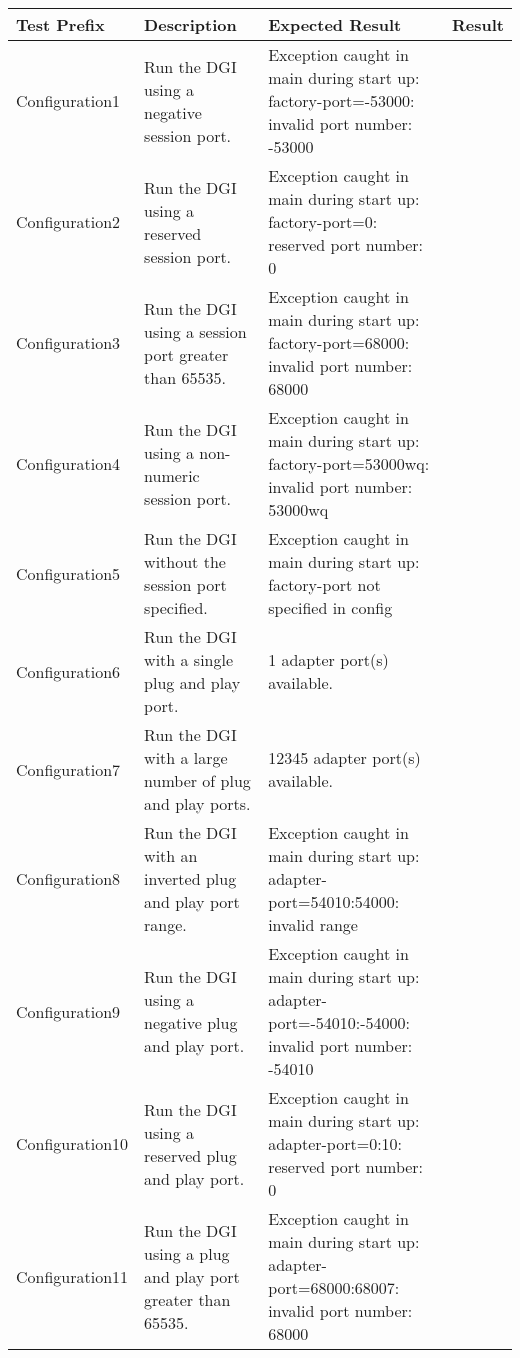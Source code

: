 \documentclass{article}
\begin{document}
%
\begin{center}
\begin{footnotesize}
\begin{longtable}{|p{3cm}|p{4cm}|p{10cm}|c|}
    \hline
    Test Prefix & Description & Expected Result & Result \\ \hline \endhead \hline \endfoot
    Configuration1 & Run the DGI using a negative session port. & Exception caught in main during start up: factory-port=-53000: invalid port number: -53000 & \\
    Configuration2 & Run the DGI using a reserved session port. & Exception caught in main during start up: factory-port=0: reserved port number: 0 & \\
    Configuration3 & Run the DGI using a session port greater than 65535. & Exception caught in main during start up: factory-port=68000: invalid port number: 68000 & \\
    Configuration4 & Run the DGI using a non-numeric session port. & Exception caught in main during start up: factory-port=53000wq: invalid port number: 53000wq & \\
    Configuration5 & Run the DGI without the session port specified. & Exception caught in main during start up: factory-port not specified in config & \\
    Configuration6 & Run the DGI with a single plug and play port. & 1 adapter port(s) available. & \\
    Configuration7 & Run the DGI with a large number of plug and play ports. & 12345 adapter port(s) available. & \\
    Configuration8 & Run the DGI with an inverted plug and play port range. & Exception caught in main during start up: adapter-port=54010:54000: invalid range & \\
    Configuration9 & Run the DGI using a negative plug and play port. & Exception caught in main during start up: adapter-port=-54010:-54000: invalid port number: -54010 & \\
    Configuration10 & Run the DGI using a reserved plug and play port. & Exception caught in main during start up: adapter-port=0:10: reserved port number: 0 & \\
    Configuration11 & Run the DGI using a plug and play port greater than 65535. & Exception caught in main during start up: adapter-port=68000:68007: invalid port number: 68000 & \\

\end{longtable}
\end{footnotesize}
\end{center}
\end{document}
